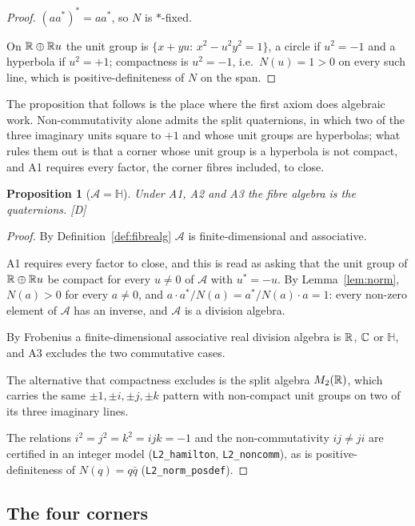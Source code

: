 \documentclass[11pt,a4paper]{article}
\theoremstyle{plain}
\newtheorem{proposition}[theorem]{Proposition}
\theoremstyle{definition}
\theoremstyle{remark}
\newcommand{\Hquat}{\mathbb{H}}
\newcommand{\rigD}{[\textup{D}]}
\begin{document}
\begin{proof}
$(aa^{*})^{*}=aa^{*}$, so $N$ is $*$-fixed.

On $\mathbb{R}\oplus\mathbb{R} u$ the unit group is $\{x+yu:\,x^{2}-u^{2}y^{2}=1\}$, a circle if $u^{2}=-1$ and a hyperbola if $u^{2}=+1$; compactness is $u^{2}=-1$, i.e.\ $N(u)=1>0$ on every such line, which is positive-definiteness of $N$ on the span.
\end{proof}

The proposition that follows is the place where the first axiom does algebraic work. Non-commutativity alone admits the split quaternions, in which two of the three imaginary units square to $+1$ and whose unit groups are hyperbolas; what rules them out is that a corner whose unit group is a hyperbola is not compact, and A1 requires every factor, the corner fibres included, to close.

\begin{proposition}[$\mathcal{A}=\Hquat$]\label{prop:H}
Under A1, A2 and A3 the fibre algebra is the quaternions. \rigD
\end{proposition}

\begin{proof}
By Definition~\ref{def:fibrealg} $\mathcal{A}$ is finite-dimensional and associative.

A1 requires every factor to close, and this is read as asking that the unit group of $\mathbb{R}\oplus\mathbb{R} u$ be compact for every $u\neq0$ of $\mathcal{A}$ with $u^{*}=-u$. By Lemma~\ref{lem:norm}, $N(a)>0$ for every $a\neq0$, and $a\cdot a^{*}/N(a)=a^{*}/N(a)\cdot a=1$: every non-zero element of $\mathcal{A}$ has an inverse, and $\mathcal{A}$ is a division algebra.

By Frobenius \cite{Frobenius1878} a finite-dimensional associative real division algebra is $\mathbb{R}$, $\mathbb{C}$ or $\Hquat$, and A3 excludes the two commutative cases.

The alternative that compactness excludes is the split algebra $M_{2}(\mathbb{R})$, which carries the same $\pm1,\pm i,\pm j,\pm k$ pattern with non-compact unit groups on two of its three imaginary lines.

The relations $i^{2}=j^{2}=k^{2}=ijk=-1$ and the non-commutativity $ij\neq ji$ are certified in an integer model (\texttt{L2\_hamilton}, \texttt{L2\_noncomm}), as is positive-definiteness of $N(q)=q\bar q$ (\texttt{L2\_norm\_posdef}).
\end{proof}

\subsection{The four corners}
\end{document}
